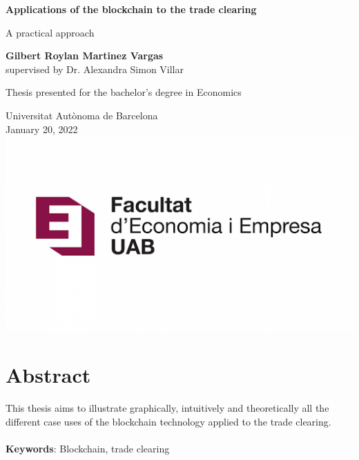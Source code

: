 \documentclass[12pt]{article}
\begin{document}
\begin{titlepage}

    \begin{center}
        \vspace*{1cm}
            
        \Huge
        \textbf{Applications of the blockchain to the trade clearing}
        
            
        \vspace{0.5cm}
        \LARGE A practical approach
            
        \vspace{1.5cm}
            
        \textbf{Gilbert Roylan Martinez Vargas}\\
        \Large supervised by Dr. Alexandra Simon Villar
        
        \vfill
            

            
        Thesis presented for the bachelor's degree in Economics
            
        \vspace{0.8cm}
            
            
        \Large
        Universitat Autònoma de Barcelona\\
        January 20, 2022\\
        \includegraphics[scale=0.3]{cover/portada.png} 

            
    \end{center}
\end{titlepage}


\section*{Abstract}
This thesis aims to illustrate graphically, intuitively and theoretically all the different case uses of the blockchain technology applied to the trade clearing. \\
\\
\noindent\textbf{Keywords}: Blockchain, trade clearing
\pagebreak
\end{document}
